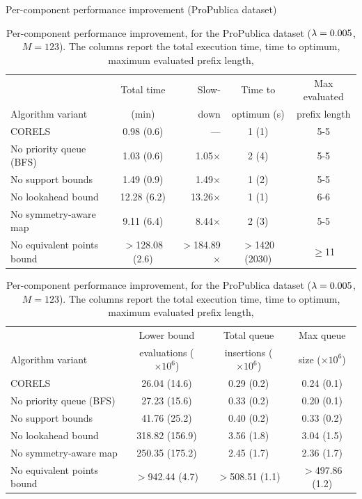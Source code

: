 \begin{table}[t!]
\centering
Per-component performance improvement (ProPublica dataset) \\
\vspace{1mm}
\begin{tabular}{l | c  r | c | c}
& Total time & Slow- & Time to & Max evaluated \\
Algorithm variant & (min) & down & optimum (s) & prefix length \\
\hline
CORELS & 0.98 (0.6) & --- & 1 (1) & 5-5 \\
No priority queue (BFS) & 1.03 (0.6) & 1.05$\times$ & 2 (4) & 5-5 \\
No support bounds & 1.49 (0.9) & 1.49$\times$ & 1 (2) & 5-5 \\
No lookahead bound & 12.28 (6.2) & 13.26$\times$ & 1 (1) & 6-6 \\
No symmetry-aware map & 9.11 (6.4) & 8.44$\times$ & 2 (3) & 5-5 \\
No equivalent points bound & $>$128.08 (2.6) & $>$184.89$\times$ & $>$1420 (2030) & $\ge$11 \\
\hline
\end{tabular}
\begin{tabular}{l | c | c | c}
\hline
 & Lower bound & Total queue &  Max queue \\
Algorithm variant & evaluations ($\times 10^6$) & insertions ($\times 10^6$) & size ($\times 10^6$) \\
\hline
CORELS & 26.04 (14.6) & 0.29 (0.2) & 0.24 (0.1) \\
No priority queue (BFS) & 27.23 (15.6) & 0.33 (0.2) & 0.20 (0.1) \\
No support bounds & 41.76 (25.2) & 0.40 (0.2) & 0.33 (0.2) \\
No lookahead bound & 318.82 (156.9) & 3.56 (1.8) & 3.04 (1.5) \\
No symmetry-aware map & 250.35 (175.2) & 2.45 (1.7) & 2.36 (1.7) \\
No equivalent points bound & $>$942.44 (4.7) & $>$508.51 (1.1) & $>$497.86 (1.2) \\
\end{tabular}
\caption{Per-component performance improvement, for the ProPublica dataset
(${{\lambda} = 0.005}$, ${M = 123}$).
%
The columns report the total execution time,
time to optimum, maximum evaluated prefix length,
}
\end{table}
